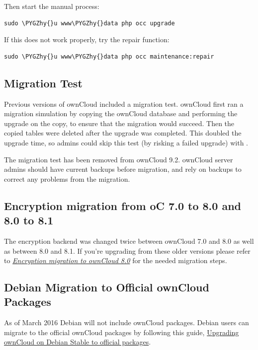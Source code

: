 \documentclass[letterpaper,10pt,english]{sphinxmanual}
\def\PYGZhy{\char`\-}
\begin{document}
Then start the manual process:

\begin{Verbatim}[commandchars=\\\{\}]
sudo \PYGZhy{}u www\PYGZhy{}data php occ upgrade
\end{Verbatim}

If this does not work properly, try the repair function:

\begin{Verbatim}[commandchars=\\\{\}]
sudo \PYGZhy{}u www\PYGZhy{}data php occ maintenance:repair
\end{Verbatim}


\subsection{Migration Test}
\label{maintenance/upgrade:migration-test-label}\label{maintenance/upgrade:migration-test}
Previous versions of ownCloud included a migration test. ownCloud first ran a migration
simulation by copying the ownCloud database and performing the upgrade on the copy, to
ensure that the migration would succeed. Then the copied tables were deleted after the
upgrade was completed. This doubled the upgrade time, so admins could skip this test
(by risking a failed upgrade) with .

The migration test has been removed from ownCloud 9.2. ownCloud server admins should have
current backups before migration, and rely on backups to correct any problems from the migration.


\subsection{Encryption migration from oC 7.0 to 8.0 and 8.0 to 8.1}
\label{maintenance/upgrade:encryption-migration-from-oc-7-0-to-8-0-and-8-0-to-8-1}
The encryption backend was changed twice between ownCloud 7.0 and 8.0 as well as
between 8.0 and 8.1. If you're upgrading from these older versions please refer to
{\hyperref[configuration_files/encryption_configuration:upgrading-encryption-label]{\emph{Encryption migration to ownCloud 8.0}}} for the needed migration steps.


\subsection{Debian Migration to Official ownCloud Packages}
\label{maintenance/upgrade:debian-migration-to-official-owncloud-packages}
As of March 2016 Debian will not include ownCloud packages. Debian users can
migrate to the official ownCloud packages by following this guide,
\href{https://owncloud.org/blog/upgrading-owncloud-on-debian-stable-to-official-packages/}{Upgrading ownCloud on Debian Stable to official packages}.
\end{document}
